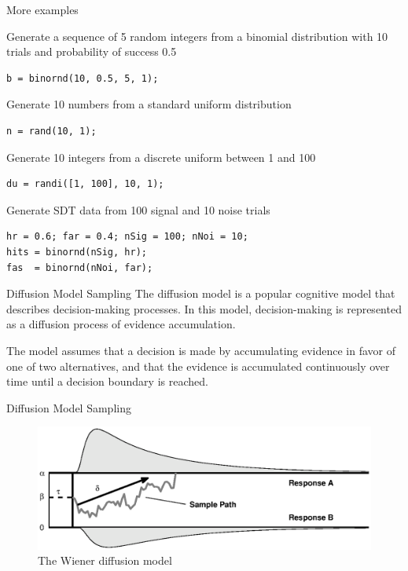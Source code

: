 \documentclass{beamer}
\begin{document}
\begin{frame}[fragile]{More examples}

Generate a sequence of 5 random integers from a binomial distribution with 10 trials and probability of success 0.5
    \begin{lstlisting}[style=matlab]
b = binornd(10, 0.5, 5, 1);
    \end{lstlisting}

Generate 10 numbers from a standard uniform distribution
    \begin{lstlisting}[style=matlab]
n = rand(10, 1);
    \end{lstlisting}

Generate 10 integers from a discrete uniform between 1 and 100
    \begin{lstlisting}[style=matlab]
du = randi([1, 100], 10, 1);
    \end{lstlisting}
    
Generate SDT data from 100 signal and 10 noise trials
    \begin{lstlisting}[style=matlab]
hr = 0.6; far = 0.4; nSig = 100; nNoi = 10;
hits = binornd(nSig, hr);
fas  = binornd(nNoi, far);
    \end{lstlisting}

\end{frame}





\begin{frame}{Diffusion Model Sampling}
The diffusion model is a popular cognitive model that describes decision-making processes. In this model, decision-making is represented as a diffusion process of evidence accumulation.

The model assumes that a decision is made by accumulating evidence in favor of one of two alternatives, and that the evidence is accumulated continuously over time until a decision boundary is reached.
\end{frame}


\begin{frame}{Diffusion Model Sampling}
\begin{figure}[htp]
\centering
\includegraphics[scale=0.7]{wdm.eps}
\caption{The Wiener diffusion model}
\label{}
\end{figure}
\end{frame}
\end{document}
